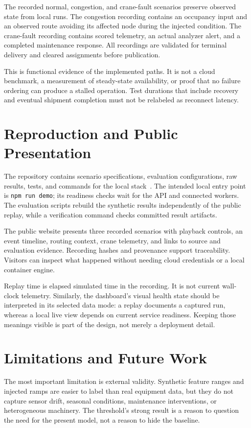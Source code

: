 \documentclass[journal]{IEEEtran}
\begin{document}
The recorded normal, congestion, and crane-fault scenarios preserve observed state from local runs. The congestion recording contains an occupancy input and an observed route avoiding its affected node during the injected condition. The crane-fault recording contains scored telemetry, an actual analyzer alert, and a completed maintenance response. All recordings are validated for terminal delivery and cleared assignments before publication.

This is functional evidence of the implemented paths. It is not a cloud benchmark, a measurement of steady-state availability, or proof that no failure ordering can produce a stalled operation. Test durations that include recovery and eventual shipment completion must not be relabeled as reconnect latency.

\section{Reproduction and Public Presentation}
The repository contains scenario specifications, evaluation configurations, raw results, tests, and commands for the local stack~\citep{source,evidence}. The intended local entry point is \texttt{npm run demo}; its readiness checks wait for the API and connected workers. The evaluation scripts rebuild the synthetic results independently of the public replay, while a verification command checks committed result artifacts.

The public website presents three recorded scenarios with playback controls, an event timeline, routing context, crane telemetry, and links to source and evaluation evidence. Recording hashes and provenance support traceability. Visitors can inspect what happened without needing cloud credentials or a local container engine.

Replay time is elapsed simulated time in the recording. It is not current wall-clock telemetry. Similarly, the dashboard's visual health state should be interpreted in its selected data mode: a replay documents a captured run, whereas a local live view depends on current service readiness. Keeping those meanings visible is part of the design, not merely a deployment detail.

\section{Limitations and Future Work}
The most important limitation is external validity. Synthetic feature ranges and injected ramps are easier to label than real equipment data, but they do not capture sensor drift, seasonal conditions, maintenance interventions, or heterogeneous machinery. The threshold's strong result is a reason to question the need for the present model, not a reason to hide the baseline.
\end{document}
